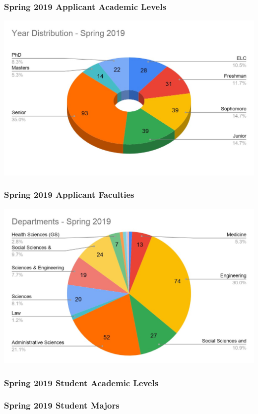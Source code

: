       \begin{frame}
        \frametitle{Spring 2019 Applicant Academic Levels}
        \centering
        \includegraphics[height=0.75\textheight]{images/year_distribution_spr2019.jpg}
      
      \end{frame}

      \begin{frame}
        \frametitle{Spring 2019 Applicant Faculties}
        \centering
        \includegraphics[height=0.75\textheight]{images/departments_spr2019.jpg}
      
      \end{frame}

      \begin{frame}
        \frametitle{Spring 2019 Student Academic Levels}
        
      
      \end{frame}

      \begin{frame}
        \frametitle{Spring 2019 Student Majors}
       
      
      \end{frame}

